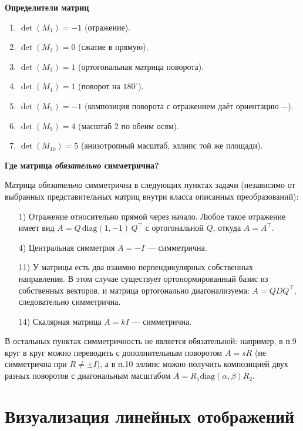 \textbf{Определители матриц}

\begin{enumerate}
  \item $\det(M_1)=-1$ (отражение).
  \item $\det(M_2)=0$ (сжатие в прямую).
  \item $\det(M_3)=1$ (ортогональная матрица поворота).
  \item $\det(M_4)=1$ (поворот на $180^\circ$).
  \item $\det(M_5)=-1$ (композиция поворота с отражением даёт ориентацию $-$).
  \item $\det(M_9)=4$ (масштаб $2$ по обеим осям).
  \item $\det(M_{10})=5$ (анизотропный масштаб, эллипс той же площади).
\end{enumerate}

\textbf{Где матрица \emph{обязательно} симметрична?}

Матрица \emph{обязательно} симметрична в следующих пунктах задачи (независимо от выбранных представительных матриц внутри класса описанных преобразований):

\begin{enumerate}
  \item[1)] Отражение относительно прямой через начало. Любое такое отражение имеет вид $A=Q\,\mathrm{diag}(1,-1)\,Q^\top$ с ортогональной $Q$, откуда $A=A^\top$.
  \item[4)] Центральная симметрия $A=-I$ — симметрична.
  \item[11)] У матрицы есть два взаимно перпендикулярных собственных направления. В этом случае существует ортонормированный базис из собственных векторов, и матрица ортогонально диагонализуема: $A=Q D Q^\top$, следовательно симметрична.
  \item[14)] Скалярная матрица $A=kI$ — симметрична.
\end{enumerate}

В остальных пунктах симметричность не является обязательной: например, в п.9 круг в круг можно переводить с дополнительным поворотом $A=sR$ (не симметрична при $R\ne\pm I$), а в п.10 эллипс можно получить композицией двух разных поворотов с диагональным масштабом $A=R_1 \mathrm{diag}(\alpha,\beta) R_2$.

\section*{Визуализация линейных отображений}

